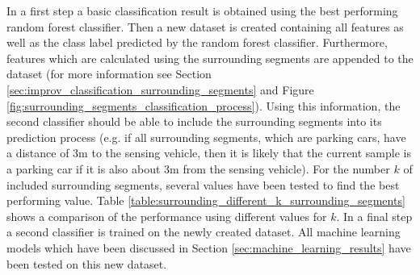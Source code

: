 In a first step a basic classification result is obtained using the best performing random forest classifier.
Then a new dataset is created containing all features as well as the class label predicted by the random forest classifier. 
Furthermore, features which are calculated using the surrounding segments are appended to the dataset (for more information see Section \ref{sec:improv_classification_surrounding_segments} and Figure \ref{fig:surrounding_segments_classification_process}).
 Using this information, the second classifier should be able to include the surrounding segments into its prediction process (e.g. if all surrounding segments, which are parking cars, have a distance of 3m to the sensing vehicle, then it is likely that the current sample is a parking car if it is also about 3m from the sensing vehicle). For the number $k$ of included surrounding segments, several values have been tested to find the best performing value.
Table \ref{table:surrounding_different_k_surrounding_segments} shows a comparison of the performance using different values for $k$.
In a final step a second classifier is trained on the newly created dataset. All machine learning models which have been discussed in Section \ref{sec:machine_learning_results} have been tested on this new dataset.


\begin{table}



\caption{Comparison of the performance when taking different values for the number of surrounding samples ($k$) in the two-staged classification process. The table is sorted descending using the f-measure of the \emph{parking car}-class.}
\label{table:surrounding_different_k_surrounding_segments}
\end{table}


